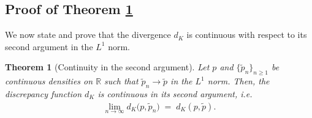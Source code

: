 \documentclass{article}
\newtheorem{theorem}{Theorem}[section]
\begin{document}
\subsection{Proof of Theorem \ref{thm:continuity-second-arg}}
We now state and prove that the divergence \(d_K\) is continuous with respect to its second argument in the \(L^1\) norm.

\begin{theorem}[Continuity in the second argument]
\label{thm:continuity-second-arg}
Let $p$ and $\{\tilde{p}_n\}_{n \ge 1}$ be continuous densities on $\mathbb{R}$ such that $\tilde{p}_n \to \tilde{p}$ in the $L^1$ norm. Then, the discrepancy function $d_{K}$ is continuous in its second argument, i.e.
\begin{align*}
\lim_{n\to\infty} d_{K}\bigl(p,\tilde{p}_n\bigr)
\;=\;
d_{K}(p,\tilde{p}).
\end{align*}
\end{theorem}
\end{document}
